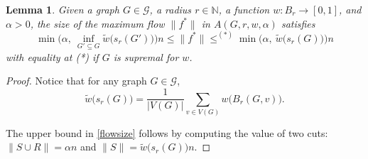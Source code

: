 \documentclass[12pt,a4paper]{article}
\newtheorem{Lemma}[Theorem]{Lemma}
\newcommand{\G}{\mathcal{G}}
\newcommand{\N}{\mathbb{N}}
\renewcommand{\:}{\colon}
\begin{document}
\begin{Lemma} \label{aflowsize}
Given a graph $G \in \G$, a radius $r \in \N$, a function $w \: B_r \rightarrow [0, 1]$, and $\alpha > 0$, the size of the maximum flow $\big\|f^*\big\|$ in $A(G, r, w, \alpha)$ satisfies
\begin{equation}\label{flowsize}
\min\Big(\alpha,\ \inf_{G' \subseteq G} \tilde{w}\big(s_r(G')\big)\Big) n
\le \big\|f^*\big\|
\le^{(*)} \min\Big(\alpha,\ \tilde{w}\big(s_r(G)\big)\Big) n
\end{equation}
with equality at (*) if $G$ is supremal for $w$.
\end{Lemma}

\begin{proof}
Notice that for any graph $G \in \G$,
\begin{equation}\label{tildew}
\tilde{w}\big(s_r(G)\big) = \frac{1}{|V(G)|} \sum_{v \in V(G)} w\big(B_r(G, v)\big).
\end{equation}

The upper bound in \eqref{flowsize} follows by computing the value of two cuts: $\big\|S \cup R\big\| = \alpha n$ and $\big\|S\big\| = \tilde{w}\big(s_r(G)\big) n$. 


\end{proof}
\end{document}
